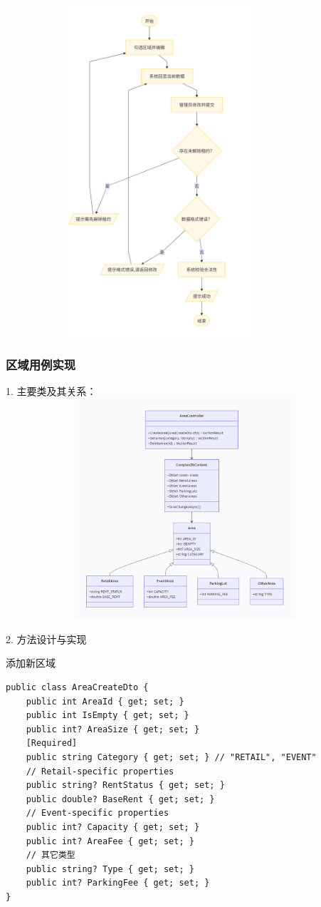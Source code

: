 \documentclass[]{article}
\begin{document}
\includegraphics[width=4.45694in,height=4.83819in]{media/media/image_2-3-3.png}

\hypertarget{ux7528ux4f8b-1ux5b9eux73b0}{%
  \subsubsection{区域用例实现}\label{ux7528ux4f8b-1ux5b9eux73b0}}
1. 主要类及其关系：
\includegraphics[width=6.06528in,height=3.22222in]{media/media/image_2-3-4.png}

2. 方法设计与实现

添加新区域

\begin{verbatim}
public class AreaCreateDto {
    public int AreaId { get; set; }
    public int IsEmpty { get; set; }
    public int? AreaSize { get; set; }
    [Required]
    public string Category { get; set; } // "RETAIL", "EVENT"
    // Retail-specific properties
    public string? RentStatus { get; set; }
    public double? BaseRent { get; set; }
    // Event-specific properties
    public int? Capacity { get; set; }
    public int? AreaFee { get; set; }
    // 其它类型
    public string? Type { get; set; }
    public int? ParkingFee { get; set; }
}
\end{verbatim}
\end{document}
